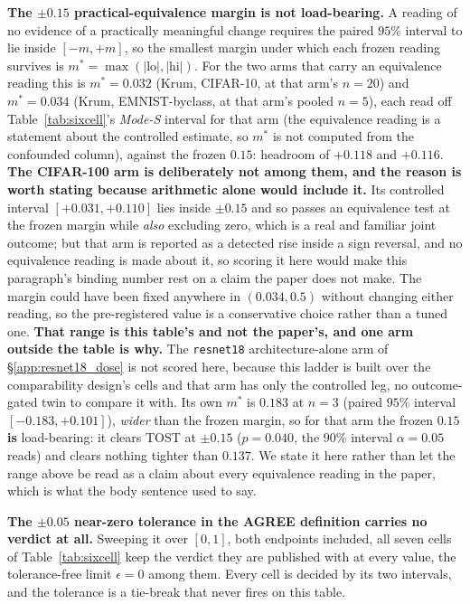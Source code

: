 \documentclass{article}
\begin{document}
\textbf{The $\pm0.15$ practical-equivalence margin is not load-bearing.} A reading of no evidence of a practically meaningful change requires the paired $95\%$ interval to lie inside
$[-m,+m]$, so the smallest margin under which each frozen reading survives is
$m^{\ast} = \max(|\mathrm{lo}|,|\mathrm{hi}|)$. For the two arms that carry an equivalence
reading this is $m^{\ast}{=}0.032$ (Krum, CIFAR-10, at that arm's $n{=}20$) and $m^{\ast}{=}0.034$ (Krum,
EMNIST-byclass, at that arm's pooled $n{=}5$), each read off Table~\ref{tab:sixcell}'s \emph{Mode-S} interval for that
arm (the equivalence reading is a statement about the controlled estimate, so $m^{\ast}$ is not
computed from the confounded column), against the frozen $0.15$: headroom of $+0.118$
and $+0.116$. \textbf{The CIFAR-100 arm is deliberately not among them, and the reason is worth
stating because arithmetic alone would include it.} Its controlled interval $[+0.031,+0.110]$ lies
inside $\pm0.15$ and so passes an equivalence test at the frozen margin while \emph{also} excluding
zero, which is a real and familiar joint outcome; but that arm is reported as a detected rise inside a
sign reversal, and no equivalence reading is made about it, so scoring it here would make this
paragraph's binding number rest on a claim the paper does not make. The margin could
have been fixed anywhere in $(0.034, 0.5)$ without changing either reading, so the pre-registered
value is a conservative choice rather than a tuned one.
\textbf{That range is this table's and not the paper's, and one arm outside the table is why.} The
\texttt{resnet18} architecture-alone arm of §\ref{app:resnet18_dose} is not scored here, because this
ladder is built over the comparability design's cells and that arm has only the controlled leg, no
outcome-gated twin to compare it with. Its own $m^{\ast}$ is $0.183$ at $n{=}3$ (paired $95\%$ interval
$[-0.183,+0.101]$), \emph{wider} than the frozen margin, so for that arm the frozen $0.15$ \textbf{is}
load-bearing: it clears TOST at $\pm0.15$ ($p{=}0.040$, the $90\%$ interval $\alpha{=}0.05$ reads) and
clears nothing tighter than $0.137$. We state it here rather than let the range above be read as a
claim about every equivalence reading in the paper, which is what the body sentence used to say.

\textbf{The $\pm0.05$ near-zero tolerance in the AGREE definition carries no verdict at all.}
Sweeping it over $[0,1]$, both endpoints included, all seven cells of Table~\ref{tab:sixcell} keep the
verdict they are published with at every value, the tolerance-free limit $\epsilon{=}0$ among them. Every cell is decided by
its two intervals, and the tolerance is a tie-break that never fires on this table.
\end{document}

